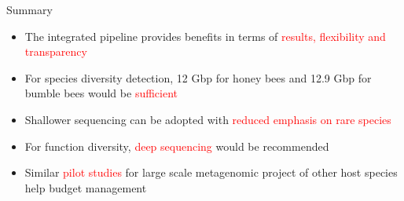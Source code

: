 \documentclass{beamer}
\begin{document}
\begin{frame}{Summary}
    \begin{itemize}
        \item The integrated pipeline provides benefits in terms of \textcolor{red}{results, flexibility and transparency}
        \item For species diversity detection, 12 Gbp for honey bees and 12.9 Gbp for bumble bees would be \textcolor{red}{sufficient}
        \item Shallower sequencing can be adopted with \textcolor{red}{reduced emphasis on rare species}
        \item For function diversity, \textcolor{red}{deep sequencing} would be recommended
        \item Similar \textcolor{red}{pilot studies} for large scale metagenomic project of other host species help budget management
    \end{itemize}
\end{frame}
\end{document}
